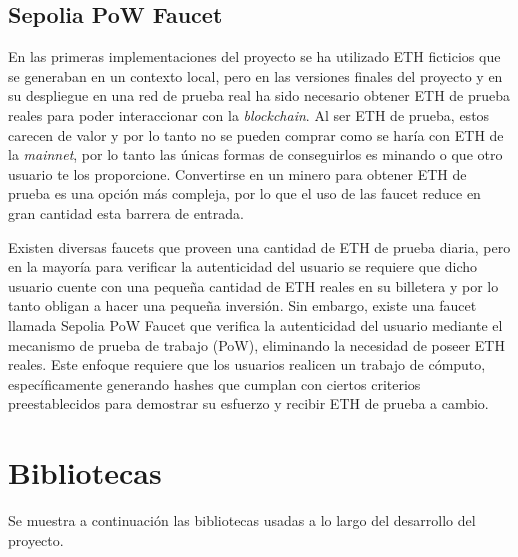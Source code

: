 \subsection{Sepolia PoW Faucet}

En las primeras implementaciones del proyecto se ha utilizado ETH ficticios que se generaban en un contexto local, pero en las versiones finales del proyecto y en su despliegue en una red de prueba real ha sido necesario obtener ETH de prueba reales para poder interaccionar con la \textit{blockchain}.
Al ser ETH de prueba, estos carecen de valor y por lo tanto no se pueden comprar como se haría con ETH de la \textit{mainnet}, por lo tanto las únicas formas de conseguirlos es minando o que otro usuario te los proporcione.
Convertirse en un minero para obtener ETH de prueba es una opción más compleja, por lo que el uso de las faucet reduce en gran cantidad esta barrera de entrada.

Existen diversas faucets que proveen una cantidad de ETH de prueba diaria, pero en la mayoría para verificar la autenticidad del usuario se requiere que dicho usuario cuente con una pequeña cantidad de ETH reales en su billetera y por lo tanto obligan a hacer una pequeña inversión.
Sin embargo, existe una faucet llamada Sepolia PoW Faucet que verifica la autenticidad del usuario mediante el mecanismo de prueba de trabajo (PoW), eliminando la necesidad de poseer ETH reales.
Este enfoque requiere que los usuarios realicen un trabajo de cómputo, específicamente generando hashes que cumplan con ciertos criterios preestablecidos para demostrar su esfuerzo y recibir ETH de prueba a cambio. 


\section{Bibliotecas}

Se muestra a continuación las bibliotecas usadas a lo largo del desarrollo del proyecto.

